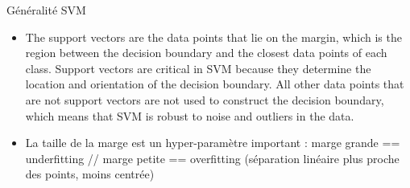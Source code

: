 \documentclass{article}
\theoremstyle{plain}%
\theoremstyle{definition}
\theoremstyle{remark}
\begin{document}
Généralité SVM 
\begin{itemize}
    
    \item  The support vectors are the data points that lie on the margin, which is the region between the decision boundary and the closest data points of each class. Support vectors are critical in SVM because they determine the location and orientation of the decision boundary. All other data points that are not support vectors are not used to construct the decision boundary, which means that SVM is robust to noise and outliers in the data.
    \item La taille de la marge est un hyper-paramètre important : marge grande == underfitting // marge petite == overfitting (séparation linéaire plus proche des points, moins centrée)
\end{itemize}
\end{document}
